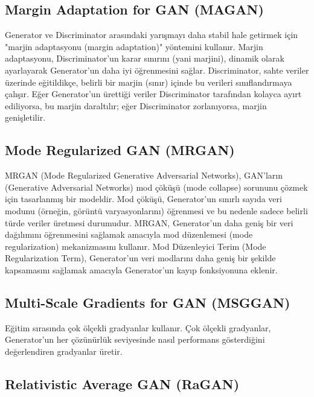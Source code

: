 \newpage

\subsection{Margin Adaptation for GAN (MAGAN)}

Generator ve Discriminator arasındaki yarışmayı daha stabil hale getirmek için "marjin adaptasyonu (margin adaptation)" yöntemini kullanır. Marjin adaptasyonu, Discriminator'un karar sınırını (yani marjini), dinamik olarak ayarlayarak Generator'un daha iyi öğrenmesini sağlar. Discriminator, sahte veriler üzerinde eğitildikçe, belirli bir marjin (sınır) içinde bu verileri sınıflandırmaya çalışır. Eğer Generator'un ürettiği veriler Discriminator tarafından kolayca ayırt ediliyorsa, bu marjin daraltılır; eğer Discriminator zorlanıyorsa, marjin genişletilir.

\newpage

\subsection{Mode Regularized GAN (MRGAN)}

MRGAN (Mode Regularized Generative Adversarial Networks), GAN’ların (Generative Adversarial Networks) mod çöküşü (mode collapse) sorununu çözmek için tasarlanmış bir modeldir. Mod çöküşü, Generator'un sınırlı sayıda veri modunu (örneğin, görüntü varyasyonlarını) öğrenmesi ve bu nedenle sadece belirli türde veriler üretmesi durumudur. MRGAN, Generator'un daha geniş bir veri dağılımını öğrenmesini sağlamak amacıyla mod düzenlemesi (mode regularization) mekanizmasını kullanır. Mod Düzenleyici Terim (Mode Regularization Term), Generator'un veri modlarını daha geniş bir şekilde kapsamasını sağlamak amacıyla Generator'un kayıp fonksiyonuna eklenir. 

\newpage

\subsection{Multi-Scale Gradients for GAN (MSGGAN)}

Eğitim sırasında çok ölçekli gradyanlar kullanır. Çok ölçekli gradyanlar, Generator'un her çözünürlük seviyesinde nasıl performans gösterdiğini değerlendiren gradyanlar üretir.

\newpage

\subsection{Relativistic Average GAN (RaGAN)}

